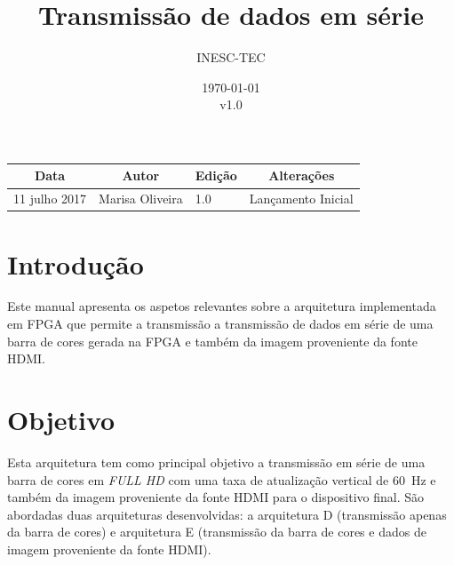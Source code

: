 \documentclass[11pt,a4paper]{article}
\title{Transmissão de dados em série} %
\author{INESC-TEC}
\date{\today \\ v1.0} %
\begin{document}
	
	\maketitle %
	
	\begin{table}[h!]
		\centering
		\label{my-label}
		\begin{tabular}{@{}llll@{}}
			\toprule
			\multicolumn{1}{c}{\textbf{Data}} & \multicolumn{1}{c}{\textbf{Autor}} & \multicolumn{1}{c}{\textbf{Edição}} & \multicolumn{1}{c}{\textbf{Alterações}} \\ \midrule
			11 julho 2017                     & Marisa Oliveira                    & 1.0                                 & Lançamento Inicial                       \\ \bottomrule
		\end{tabular}
	\end{table}
	
	
	
	\section{Introdução}
	
	Este manual apresenta os aspetos relevantes sobre a arquitetura implementada em FPGA que permite a transmissão a transmissão de dados em série de uma barra de cores gerada na FPGA e também da imagem proveniente da fonte HDMI.
	
	\section{Objetivo}
	
	Esta arquitetura tem como principal objetivo a transmissão em série de uma barra de cores em \textit{FULL HD} com uma taxa de atualização vertical de \SI{60}{\hertz}  e também da imagem proveniente da fonte HDMI para o dispositivo final. São abordadas duas arquiteturas desenvolvidas: a arquitetura D (transmissão apenas da barra de cores) e arquitetura E (transmissão da barra de cores e dados de imagem proveniente da fonte HDMI).
	
\end{document}
